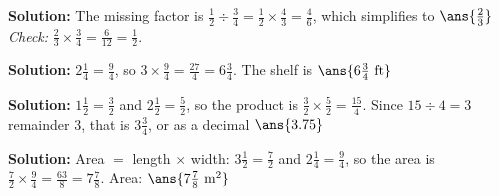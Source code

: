 \documentclass[12pt]{article}
\begin{document}
\textbf{Solution:} The missing factor is
$\tfrac{1}{2} \div \tfrac{3}{4} = \tfrac{1}{2} \times \tfrac{4}{3} =
\tfrac{4}{6}$, which simplifies to $\ans{\tfrac{2}{3}}$
\emph{Check:} $\tfrac{2}{3} \times \tfrac{3}{4} = \tfrac{6}{12} =
\tfrac{1}{2}$. \checkmark


\textbf{Solution:} $2\tfrac{1}{4} = \tfrac{9}{4}$, so
$3 \times \tfrac{9}{4} = \tfrac{27}{4} = 6\tfrac{3}{4}$. The shelf is
$\ans{6\tfrac{3}{4}\ \text{ft}}$


\textbf{Solution:} $1\tfrac{1}{2} = \tfrac{3}{2}$ and
$2\tfrac{1}{2} = \tfrac{5}{2}$, so the product is
$\tfrac{3}{2} \times \tfrac{5}{2} = \tfrac{15}{4}$. Since
$15 \div 4 = 3$ remainder 3, that is $3\tfrac{3}{4}$, or as a decimal
$\ans{3.75}$


\textbf{Solution:} Area $=$ length $\times$ width:
$3\tfrac{1}{2} = \tfrac{7}{2}$ and $2\tfrac{1}{4} = \tfrac{9}{4}$, so the
area is $\tfrac{7}{2} \times \tfrac{9}{4} = \tfrac{63}{8} = 7\tfrac{7}{8}$.
Area: $\ans{7\tfrac{7}{8}\ \text{m}^2}$
\end{document}
